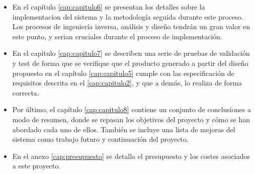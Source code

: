 \begin{itemize}
    \item En el capítulo \ref{cap:capitulo6} se presentan los detalles sobre la implementacion del sistema y la metodología seguida durante este proceso. Los procesos de ingeniería inversa, análisis y diseño tendrán un gran valor en este punto, y serian cruciales durante el proceso de implementación.

    \item En el capítulo \ref{cap:capitulo7} se describen una serie de pruebas de validación y test de forma que se verifique que el producto generado a partir del diseño propuesto en el capítulo \ref{cap:capitulo5} cumple con las especificación de requisitos descrita en el \ref{cap:capitulo2}, y que a demás, lo realiza de forma correcta.

    \item Por último, el capítulo \ref{cap:capitulo8} contiene un conjunto de conclusiones a modo de resumen, donde se repasan los objetivos del proyecto y cómo se han abordado cada uno de ellos. También se incluye una lista de mejoras del sistema como trabajo futuro y continuación del proyecto.

    \item En el anexo \ref{cap:presupuesto} se detalla el presupuesto y los costes asociados a este proyecto.
\end{itemize}

